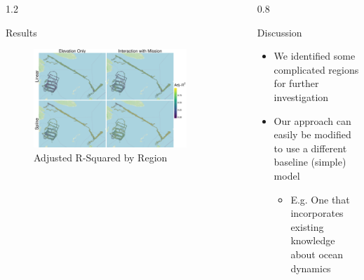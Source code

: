\documentclass[final]{beamer}
\newlength{\sepwidth}
\newlength{\colwidth}
\newcommand{\separatorcolumn}{\begin{column}{\sepwidth}\end{column}}
\begin{document}
\begin{frame}[t]
\begin{columns}[t]
\begin{column}{1.2\colwidth}
\begin{block}{Results}
\begin{figure}
\begin{center}
    \centering
    \includegraphics[width=0.92\textwidth]{Figures/R2 Map.pdf}
    \vspace{-25pt}
    \caption{Adjusted R-Squared by Region}
\end{center}
\end{figure}

  \end{block}


\end{column}

\separatorcolumn





\begin{column}{0.8\colwidth}
\vspace{-30pt}

\begin{block}{Discussion}
    \vspace{-15pt}

    \vspace{-25pt}
    \begin{itemize}
        \item We identified some complicated regions for further investigation
        \item Our approach can easily be modified to use a different baseline (simple) model
        \begin{itemize}
            \item E.g. One that incorporates existing knowledge about ocean dynamics
        \end{itemize}
    \end{itemize}


\end{block}
\end{column}
\end{columns}
\end{frame}
\end{document}
